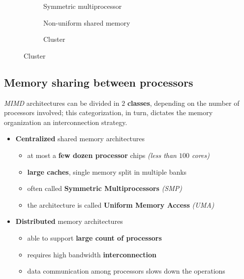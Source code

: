 \documentclass[english]{article}
\begin{document}
\begin{figure}[htbp]
  \begin{subfigure}[b]{0.33\textwidth}
    \bigskip
    \centering
    \caption{Symmetric multiprocessor}
    \label{subfig:symmetric-multiprocessor}
    \bigskip
  \end{subfigure}
  \begin{subfigure}[b]{0.33\textwidth}
    \bigskip
    \centering
    \caption{Non-uniform shared memory}
    \label{subfig:non-uniform-shared-memory}
    \bigskip
  \end{subfigure}
  \begin{subfigure}[b]{0.33\textwidth}
    \bigskip
    \centering
    \caption{Cluster}
    \label{subfig:cluster}
    \bigskip
  \end{subfigure}
\end{figure}

\subsection{Memory sharing between processors}

\textit{MIMD} architectures can be divided in \(2\) \textbf{classes}, depending on the number of processors involved;
this categorization, in turn, dictates the memory organization an interconnection strategy.

\begin{itemize}
  \item \textbf{Centralized} shared memory architectures
        \begin{itemize}
          \item at most a \textbf{few dozen processor} chips \textit{(less than \(100\) cores)}
          \item \textbf{large caches}, single memory split in multiple banks
          \item often called \textbf{Symmetric Multiprocessors} \textit{(SMP)}
          \item the architecture is called \textbf{Uniform Memory Access} \textit{(UMA)}
        \end{itemize}
  \item \textbf{Distributed} memory architectures
        \begin{itemize}
          \item able to support \textbf{large count of processors}
          \item requires high bandwidth \textbf{interconnection}
          \item data communication among processors slows down the operations
        \end{itemize}
\end{itemize}
\end{document}
